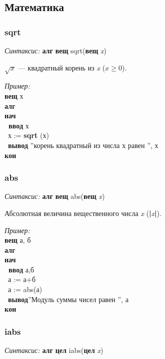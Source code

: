 \documentclass[12pt,a4paper]{article}
\newcommand{\otstup}{\textperiodcentered\ }
\begin{document}
\normalfont

\subsection{Математика}

\normalfont
\subsubsection{sqrt}

\emph{Синтаксис:} \textbf{алг} \textbf{вещ} sqrt(\textbf{вещ} \emph{x})


      $\sqrt{x}$ --- квадратный корень из \emph{x} ($x \ge 0$).

\emph{Пример:}  
\sffamily
~\\\textbf{вещ} х
~\\\textbf{алг 
~\\нач
~\\\otstup ввод} х
~\\\otstup х := \textbf{sqrt} (х)
~\\\otstup \textbf{вывод} ''корень квадратный из числа х равен '', х
~\\\textbf{кон}


\normalfont
\subsubsection{abs}

\emph{Синтаксис:} \textbf{алг} \textbf{вещ} abs(\textbf{вещ} \emph{x})


      Абсолютная величина вещественного числа \emph{x} (\textbf{|}\emph{x}\textbf{|}).

\emph{Пример:}
\sffamily
~\\\textbf{вещ} а, б
~\\\textbf{алг 
~\\нач
~\\\otstup ввод} а,б
~\\\otstup а := а+б
~\\\otstup а := abs(а)
~\\\otstup \textbf{вывод}''Модуль суммы чисел равен '', а
~\\\textbf{кон}

\normalfont
\subsubsection{iabs}

\emph{Синтаксис:} \textbf{алг} \textbf{цел} iabs(\textbf{цел} \emph{x})
\end{document}
